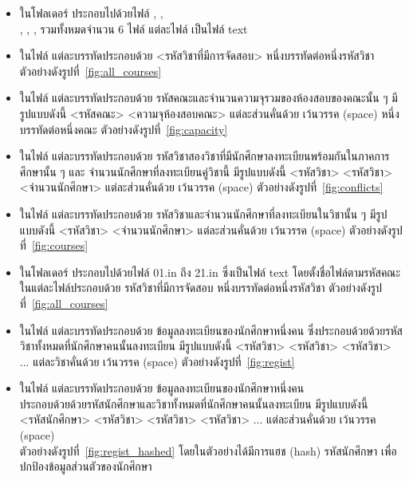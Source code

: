 \begin{itemize}
  \item ในโฟลเดอร์  ประกอบไปด้วยไฟล์ , ,
  \\ , , ,  รวมทั้งหมดจำนวน 6 ไฟล์ แต่ละไฟล์ เป็นไฟล์ text 
  \item ในไฟล์  แต่ละบรรทัดประกอบด้วย <รหัสวิชาที่มีการจัดสอบ> หนึ่งบรรทัดต่อหนึ่งรหัสวิชา ตัวอย่างดังรูปที่~\ref{fig:all_courses}
  \item ในไฟล์  แต่ละบรรทัดประกอบด้วย รหัสคณะและจำนวนความจุรวมของห้องสอบของคณะนั้น ๆ มีรูปแบบดังนี้ <รหัสคณะ> <ความจุห้องสอบคณะ> แต่ละส่วนคั่นด้วย เว้นวรรค (space) หนึ่งบรรทัดต่อหนึ่งคณะ ตัวอย่างดังรูปที่~\ref{fig:capacity}
  \item ในไฟล์  แต่ละบรรทัดประกอบด้วย รหัสวิชาสองวิชาที่มีนักศึกษาลงทะเบียนพร้อมกันในภาคการศึกษานั้น ๆ และ จำนวนนักศึกษาที่ลงทะเบียนคู่วิชานี้ มีรูปแบบดังนี้ <รหัสวิชา> <รหัสวิชา> <จำนวนนักศึกษา> แต่ละส่วนคั่นด้วย เว้นวรรค (space) ตัวอย่างดังรูปที่~\ref{fig:conflicts}
  \item ในไฟล์  แต่ละบรรทัดประกอบด้วย รหัสวิชาและจำนวนนักศึกษาที่ลงทะเบียนในวิชานั้น ๆ มีรูปแบบดังนี้ <รหัสวิชา> <จำนวนนักศึกษา> แต่ละส่วนคั่นด้วย เว้นวรรค (space) ตัวอย่างดังรูปที่~\ref{fig:courses}
  \item ในโฟลเดอร์  ประกอบไปด้วยไฟล์ 01.in ถึง 21.in ซึ่งเป็นไฟล์ text โดยตั้งชื่อไฟล์ตามรหัสคณะ ในแต่ละไฟล์ประกอบด้วย รหัสวิชาที่มีการจัดสอบ หนึ่งบรรทัดต่อหนึ่งรหัสวิชา ตัวอย่างดังรูปที่~\ref{fig:all_courses} 
  \item ในไฟล์  แต่ละบรรทัดประกอบด้วย ข้อมูลลงทะเบียนของนักศึกษาหนึ่งคน ซึ่งประกอบด้วยด้วยรหัสวิชาทั้งหมดที่นักศึกษาคนนั้นลงทะเบียน มีรูปแบบดังนี้ <รหัสวิชา> <รหัสวิชา> <รหัสวิชา> ... แต่ละวิชาคั่นด้วย เว้นวรรค (space) ตัวอย่างดังรูปที่~\ref{fig:regist}
  \item ในไฟล์  แต่ละบรรทัดประกอบด้วย ข้อมูลลงทะเบียนของนักศึกษาหนึ่งคน \\ ประกอบด้วยด้วยรหัสนักศึกษาและวิชาทั้งหมดที่นักศึกษาคนนั้นลงทะเบียน มีรูปแบบดังนี้ \\ <รหัสนักศึกษา> <รหัสวิชา> <รหัสวิชา> <รหัสวิชา> ... แต่ละส่วนคั่นด้วย เว้นวรรค (space) \\ ตัวอย่างดังรูปที่~\ref{fig:regist_hashed}
  โดยในตัวอย่างได้มีการแฮช (hash) รหัสนักศึกษา เพื่อปกป้องข้อมูลส่วนตัวของนักศึกษา
\end{itemize}

